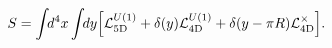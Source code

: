 \begin{equation}
  S = \int\!\!d^4x \int\!\!dy 
    \Bigl[ {\cal L}_{\rm 5D}^{U(1)} 
    + \delta(y) {\cal L}_{\rm 4D}^{U(1)}
    + \delta(y-\pi R) {\cal L}_{\rm 4D}^{\times} \Bigr].
\label{eq:Lag-U1}
\end{equation}

